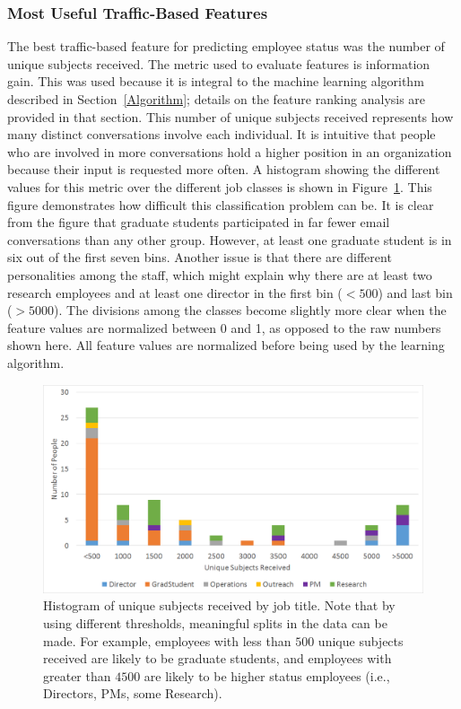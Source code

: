 \documentclass[12pt]{report}
\begin{document}
\subsubsection{Most Useful Traffic-Based Features}
The best traffic-based feature for predicting employee status was the number of unique subjects received.
The metric used to evaluate features is information gain.  This was used because it is integral to the machine learning algorithm described in Section~\ref{Algorithm}; details on the feature ranking analysis are provided in that section.
This number of unique subjects received represents how many distinct conversations involve each individual.
It is intuitive that people who are involved in more conversations hold a higher position in an organization because their input is requested more often.
A histogram showing the different values for this metric over the different job classes is shown in Figure~\ref{fig:traffic_ex_hist}.
This figure demonstrates how difficult this classification problem can be.
It is clear from the figure that graduate students participated in far fewer email conversations than any other group.
However, at least one graduate student is in six out of the first seven bins.
Another issue is that there are different personalities among the staff, which might explain why there are at least two research employees and at least one director in the first bin ($<500$) and last bin ($>5000$).
The divisions among the classes become slightly more clear when the feature values are normalized between 0 and 1, as opposed to the raw numbers shown here.
All feature values are normalized before being used by the learning algorithm.
\begin{figure}[t]
    \centering
        \includegraphics[width=\columnwidth,trim={1mm 5mm 1mm 2mm},clip]{Unique_subjects_rec_hist}
        \caption[Unique subjects received histogram]{Histogram of unique subjects received by job title.  Note that by using different thresholds, meaningful splits in the data can be made.  For example, employees with less than $500$ unique subjects received are likely to be graduate students, and employees with greater than $4500$ are likely to be higher status employees (i.e., Directors, PMs, some Research).}
        \label{fig:traffic_ex_hist}
\end{figure}
\end{document}
